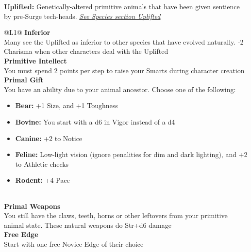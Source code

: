\begin{enumerate}
  \textbf{Uplifted:} Genetically-altered primitive animals that have been given sentience by pre-Surge tech-heads. \textit{\hyperref[sec:specie-uplifted]{See Species section Uplifted}}
  \begin{redtable}{\linewidth}{@{}L{1}@{}}
    \textbf{Inferior}\\
    Many see the Uplifted as inferior to other species that have evolved naturally. -2 Charisma when other characters deal with the Uplifted\\
    \textbf{Primitive Intellect}\\
    You must spend 2 points per step to raise your Smarts during character creation\\
    \textbf{Primal Gift}\\
    You have an ability due to your animal ancestor. Choose one of the following:
      \begin{itemize}
        \item \textbf{Bear:} +1 Size, and +1 Toughness
        \item \textbf{Bovine:} You start with a d6 in Vigor instead of a d4
        \item \textbf{Canine:} +2 to Notice
        \item \textbf{Feline:} Low-light vision (ignore penalities for dim and dark lighting), and +2 to Athletic checks
        \item \textbf{Rodent:} +4 Pace
      \end{itemize}\\
    \textbf{Primal Weapons}\\
    You still have the claws, teeth, horns or other leftovers from your primitive animal state. These natural weapons do Str+d6 damage\\
    \textbf{Free Edge}\\
    Start with one free Novice Edge of their choice\\
  \end{redtable}
  
  \hline


\end{enumerate}
